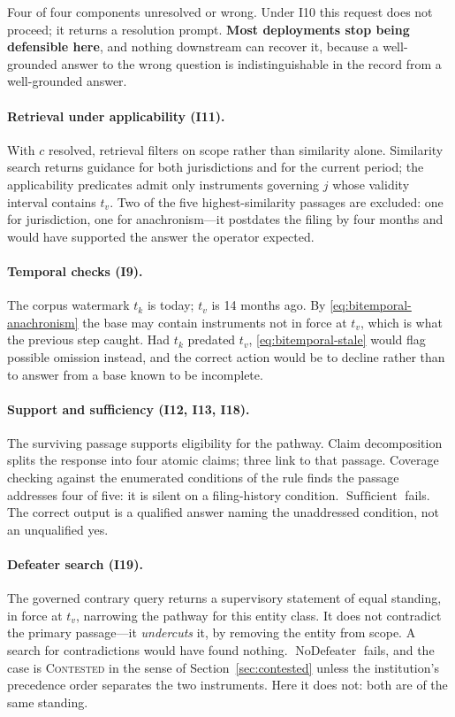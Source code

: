 \documentclass[11pt]{article}
\newcommand{\Sufficient}{\operatorname{Sufficient}}
\newcommand{\NoDefeater}{\operatorname{NoDefeater}}
\theoremstyle{plain}
\theoremstyle{definition}
\begin{document}
Four of four components unresolved or wrong. Under I10 this request does not proceed; it
returns a resolution prompt. \textbf{Most deployments stop being defensible here}, and
nothing downstream can recover it, because a well-grounded answer to the wrong question
is indistinguishable in the record from a well-grounded answer.

\paragraph{Retrieval under applicability (I11).} With $c$ resolved, retrieval filters on
scope rather than similarity alone. Similarity search returns guidance for both
jurisdictions and for the current period; the applicability predicates admit only
instruments governing $j$ whose validity interval contains $t_v$. Two of the five
highest-similarity passages are excluded: one for jurisdiction, one for
anachronism---it postdates the filing by four months and would have supported the
answer the operator expected.

\paragraph{Temporal checks (I9).} The corpus watermark $t_k$ is today; $t_v$ is 14 months
ago. By \eqref{eq:bitemporal-anachronism} the base may contain instruments not in force
at $t_v$, which is what the previous step caught. Had $t_k$ predated $t_v$,
\eqref{eq:bitemporal-stale} would flag possible omission instead, and the correct action
would be to decline rather than to answer from a base known to be incomplete.

\paragraph{Support and sufficiency (I12, I13, I18).} The surviving passage supports
eligibility for the pathway. Claim decomposition splits the response into four atomic
claims; three link to that passage. Coverage checking against the enumerated conditions
of the rule finds the passage addresses four of five: it is silent on a filing-history
condition. $\Sufficient$ fails. The correct output is a qualified answer naming the
unaddressed condition, not an unqualified yes.

\paragraph{Defeater search (I19).} The governed contrary query returns a supervisory
statement of equal standing, in force at $t_v$, narrowing the pathway for this entity
class. It does not contradict the primary passage---it \emph{undercuts} it, by removing
the entity from scope. A search for contradictions would have found nothing.
$\NoDefeater$ fails, and the case is \textsc{Contested} in the sense of
Section~\ref{sec:contested} unless the institution's precedence order separates the two
instruments. Here it does not: both are of the same standing.
\end{document}

